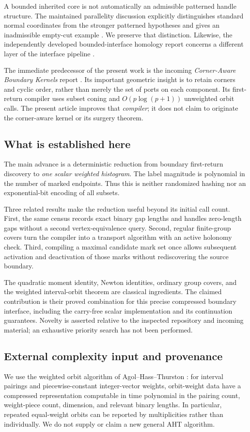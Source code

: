 \documentclass[11pt]{article}
\theoremstyle{definition}\newtheorem{definition}[theorem]{Definition}\newtheorem{example}[theorem]{Example}
\theoremstyle{remark}\newtheorem{remark}[theorem]{Remark}
\begin{document}
A bounded inherited core is not automatically an admissible patterned handle structure. The maintained parallelity discussion explicitly distinguishes standard normal coordinates from the stronger patterned hypotheses and gives an inadmissible empty-cut example \cite{parallelity}. We preserve that distinction. Likewise, the independently developed bounded-interface homology report concerns a different layer of the interface pipeline \cite{interfacehomology}.

The immediate predecessor of the present work is the incoming \emph{Corner-Aware Boundary Kernels} report \cite{corner}. Its important geometric insight is to retain corners and cyclic order, rather than merely the set of ports on each component. Its first-return compiler uses subset coning and $O(p\log(p+1))$ unweighted orbit calls. The present article improves that \emph{compiler}; it does not claim to originate the corner-aware kernel or its surgery theorem.

\subsection{What is established here}
The main advance is a deterministic reduction from boundary first-return discovery to \emph{one scalar weighted histogram}. The label magnitude is polynomial in the number of marked endpoints. Thus this is neither randomized hashing nor an exponential-bit encoding of all subsets.

Three related results make the reduction useful beyond its initial call count. First, the same census records exact binary gap lengths and handles zero-length gaps without a second vertex-equivalence query. Second, regular finite-group covers turn the compiler into a transport algorithm with an active holonomy check. Third, compiling a maximal candidate mark set once allows subsequent activation and deactivation of those marks without rediscovering the source boundary.

The quadratic moment identity, Newton identities, ordinary group covers, and the weighted interval-orbit theorem are classical ingredients. The claimed contribution is their proved combination for this precise compressed boundary interface, including the carry-free scalar implementation and its continuation guarantees. Novelty is asserted relative to the inspected repository and incoming material; an exhaustive priority search has not been performed.

\subsection{External complexity input and provenance}
We use the weighted orbit algorithm of Agol--Hass--Thurston \cite[Theorem~16]{aht}: for interval pairings and piecewise-constant integer-vector weights, orbit-weight data have a compressed representation computable in time polynomial in the pairing count, weight-piece count, dimension, and relevant binary lengths. In particular, repeated equal-weight orbits can be reported by multiplicities rather than individually. We do not supply or claim a new general AHT algorithm.
\end{document}
